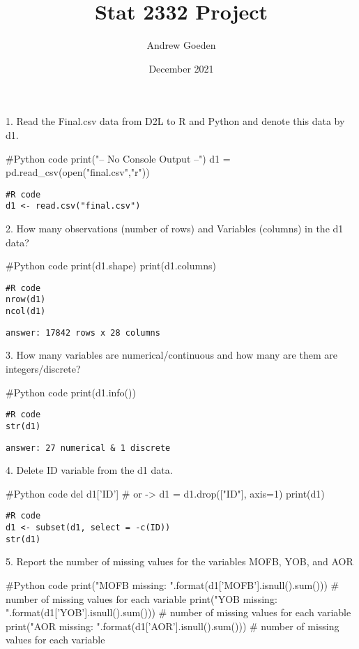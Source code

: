 \documentclass{article}
\title{Stat 2332 Project}
\author{Andrew Goeden}
\date{December 2021}
\begin{document}
\maketitle

1. Read the Final.csv data from D2L to R and Python and denote this data by d1.
\begin{pythoncode}
#Python code
print("-- No Console Output --")
d1 = pd.read_csv(open("final.csv","r"))
\end{pythoncode}

\begin{verbatim}
#R code
d1 <- read.csv("final.csv")
\end{verbatim}


2. How many observations (number of rows) and Variables (columns) in the d1 data?
\begin{pythoncode}
#Python code
print(d1.shape)
print(d1.columns)
\end{pythoncode}

\begin{verbatim}
#R code
nrow(d1)
ncol(d1)
\end{verbatim}

\begin{verbatim}
answer: 17842 rows x 28 columns
\end{verbatim}


3. How many variables are numerical/continuous and how many are them are integers/discrete?
\begin{pythoncode}
#Python code
print(d1.info())
\end{pythoncode}

\begin{verbatim}
#R code
str(d1)
\end{verbatim}

\begin{verbatim}
answer: 27 numerical & 1 discrete
\end{verbatim}


4. Delete ID variable from the d1 data.
\begin{pythoncode}
#Python code
del d1['ID'] # or -> d1 = d1.drop(["ID"], axis=1)
print(d1)
\end{pythoncode}

\begin{verbatim}
#R code
d1 <- subset(d1, select = -c(ID))
str(d1)
\end{verbatim}


5. Report the number of missing values for the variables MOFB, YOB, and AOR
\begin{pythoncode}
#Python code
print("MOFB missing: {}".format(d1['MOFB'].isnull().sum())) # number of missing values for each variable
print("YOB missing: {}".format(d1['YOB'].isnull().sum())) # number of missing values for each variable
print("AOR missing: {}".format(d1['AOR'].isnull().sum())) # number of missing values for each variable
\end{pythoncode}
\end{document}
